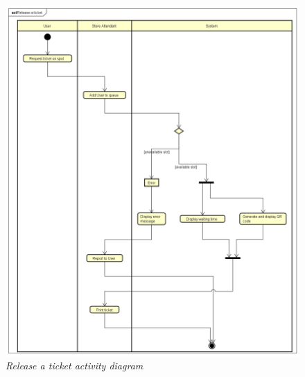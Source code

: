 \documentclass[table, 12pt]{article}
\begin{document}
\begin{figure}[H]
    \centering
    \includegraphics[scale=0.45]{assets/Activity-Diagrams/act_release.png}
    \caption{\textit{Release a ticket activity diagram}}
\end{figure}
\end{document}
